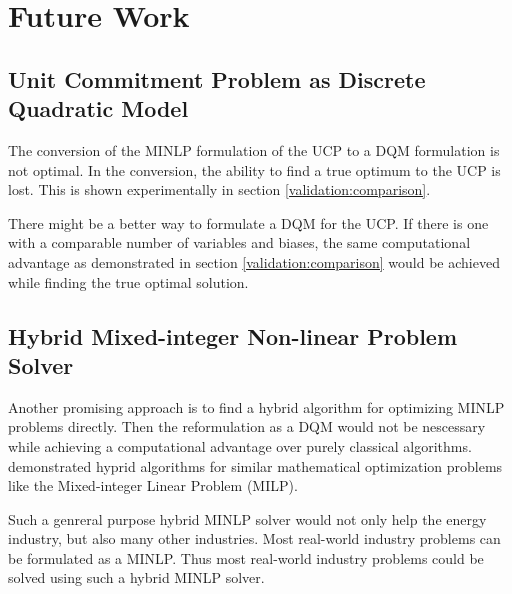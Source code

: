 \section{Future Work}

\subsection{Unit Commitment Problem as Discrete Quadratic Model}

The conversion of the MINLP formulation of the UCP to a DQM formulation is not optimal.
In the conversion, the ability to find a true optimum to the UCP is lost.
This is shown experimentally in section \ref{validation:comparison}.

There might be a better way to formulate a DQM for the UCP.
If there is one with a comparable number of variables and biases, the same computational advantage as demonstrated in section \ref{validation:comparison} would be achieved while finding the true optimal solution.

\subsection{Hybrid Mixed-integer Non-linear Problem Solver}

Another promising approach is to find a hybrid algorithm for optimizing MINLP problems directly.
Then the reformulation as a DQM would not be nescessary while achieving a computational advantage over purely classical algorithms.
\citeauthor{Ajagekar2020} demonstrated hyprid algorithms for similar mathematical optimization problems like the Mixed-integer Linear Problem (MILP).
\cite{Ajagekar2020}

Such a genreral purpose hybrid MINLP solver would not only help the energy industry, but also many other industries.
Most real-world industry problems can be formulated as a MINLP.
\cite{Belotti2009}
Thus most real-world industry problems could be solved using such a hybrid MINLP solver.
